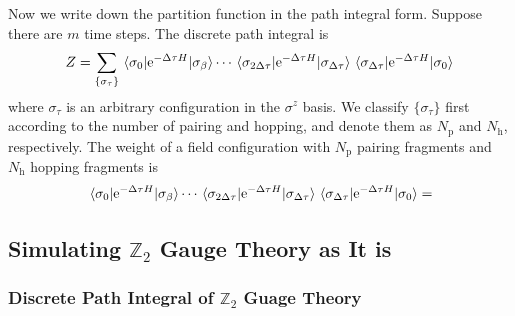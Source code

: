 \documentclass[hyperref, a4paper]{article}
\newcommand*{\ee}{\mathrm{e}}
\newcommand*{\Ztwo}{$\mathbb{Z}_2$ }
\begin{document}
Now we write down the partition function in the path integral form.
Suppose there are $m$ time steps. The discrete path integral is 
\begin{equation}
    Z = \sum_{\{\sigma_\tau\}} \mel{\sigma_0}{\ee^{-\Delta \tau H}}{\sigma_\beta} \cdots \mel{\sigma_{2\Delta \tau}}{\ee^{-\Delta \tau H}}{\sigma_{\Delta \tau}} \mel{\sigma_{\Delta \tau}}{\ee^{-\Delta \tau H}}{\sigma_{0}}  
\end{equation}
where $\sigma_\tau$ is an arbitrary configuration in the $\sigma^z$ basis.
We classify $\{\sigma_\tau\}$ first according to the number of pairing and hopping, and denote them as $N_\text{p}$ and $N_\text{h}$, respectively.
The weight of a field configuration with $N_\text{p}$ pairing fragments and $N_\text{h}$ hopping fragments is
\[
    \mel{\sigma_0}{\ee^{-\Delta \tau H}}{\sigma_\beta} \cdots \mel{\sigma_{2\Delta \tau}}{\ee^{-\Delta \tau H}}{\sigma_{\Delta \tau}} \mel{\sigma_{\Delta \tau}}{\ee^{-\Delta \tau H}}{\sigma_{0}} = 
\]

\subsection{Simulating \Ztwo Gauge Theory as It is}

\subsubsection{Discrete Path Integral of \Ztwo Guage Theory}
\end{document}
